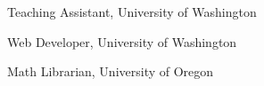 \documentclass[12pt]{article}
\newenvironment{date_section}
	{
	\vspace{-1ex}
	\leftmargini = 15ex
		\begin{itemize}[
			labelsep = *,
			labelwidth = 9ex,
			labelindent = 0ex,
			itemindent = !,
			font=\normalfont,
			align=parleft
		]{}
		\itemsep=-1.5mm
	}
	{\end{itemize}\vspace{-2ex}}
\newcommand{\yearrange}[2]{
	\item[
		{\makebox[1ex][r]{#1}}
		--
		{\makebox[1ex][l]{#2} }
		] }
\begin{document}
	\begin{date_section}
		
		\yearrange{2013}{2018} Teaching Assistant,  University of Washington
		
		\yearrange{2015}{2017} Web Developer, University of Washington
		
		
		
		\yearrange{2012}{2013} Math Librarian, University of Oregon
		
		
		
		
		
		
	\end{date_section}



\end{document}
